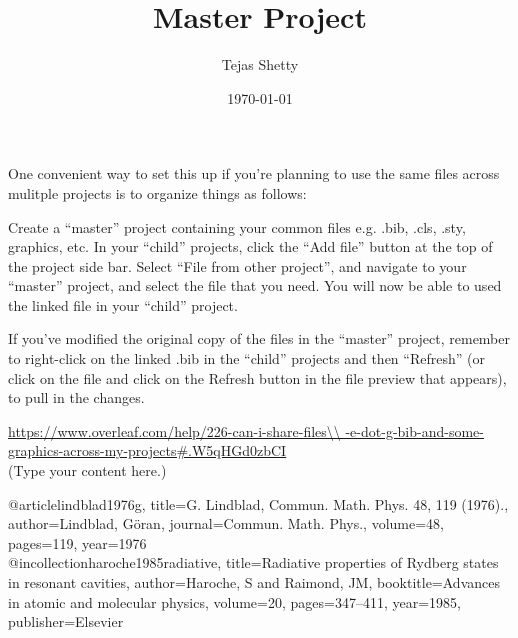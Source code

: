 \documentclass{article}
\begin{document}
\title{Master Project}
\author{Tejas Shetty}
\date{\today} %
\maketitle
One convenient way to set this up if you're planning to use the same files across mulitple projects is to organize things as follows:

Create a “master” project containing your common files e.g. .bib, .cls, .sty, graphics, etc.
In your “child” projects, click the “Add file” button at the top of the project side bar.
Select “File from other project”, and navigate to your “master” project, and select the file that you need.
You will now be able to used the linked file in your “child” project.

If you’ve modified the original copy of the files in the “master” project, remember to right-click on the linked .bib in the “child” projects and then “Refresh” (or click on the file and click on the Refresh button in the file preview that appears), to pull in the changes.

\url{https://www.overleaf.com/help/226-can-i-share-files\\
-e-dot-g-bib-and-some-graphics-across-my-projects#.W5qHGd0zbCI}\\
(Type your content here.)



@article{lindblad1976g,
  title={G. Lindblad, Commun. Math. Phys. 48, 119 (1976).},
  author={Lindblad, G{\"o}ran},
  journal={Commun. Math. Phys.},
  volume={48},
  pages={119},
  year={1976}
} \\

@incollection{haroche1985radiative,
  title={Radiative properties of Rydberg states in resonant cavities},
  author={Haroche, S and Raimond, JM},
  booktitle={Advances in atomic and molecular physics},
  volume={20},
  pages={347--411},
  year={1985},
  publisher={Elsevier}
}
\end{document}
